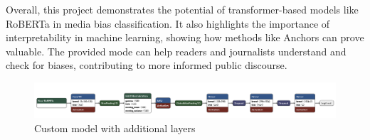 \documentclass[11pt,a4paper]{article}
\begin{document}
Overall, this project demonstrates the potential of transformer-based models like RoBERTa in media bias classification. It also highlights the importance of interpretability in machine learning, showing how methods like Anchors can prove valuable. The provided mode can help readers and journalists understand and check for biases, contributing to more informed public discourse.
\newpage
\begin{landscape}
    \begin{figure}[H]
        \centering
        \includegraphics[width=1\linewidth]{external_nn.png}
        \caption{Custom model with additional layers}
        \label{fig:Custom_model_arch}
    \end{figure}
\end{landscape}
\newpage


\end{document}

